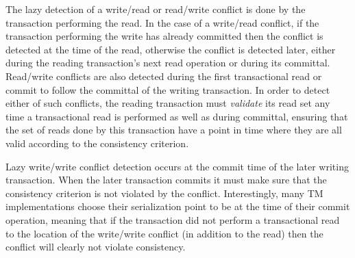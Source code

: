The lazy detection of a write/read or read/write conflict is done by the transaction performing the read.
In the case of a write/read conflict, if the transaction performing the write has already committed then the
conflict is detected at the time of the read, otherwise
the conflict is detected later, either
during the reading transaction's next read operation or during its committal.
Read/write conflicts are also detected during the first transactional read
or commit to follow the committal of the writing transaction.
In order to detect either of such conflicts, the reading transaction
 must \emph{validate} its read set any time a transactional read is performed as well as during committal, 
ensuring that the set of reads done by this transaction have a point in time where
they are all valid according to the consistency criterion.

Lazy write/write conflict detection occurs at the commit time of the
later writing transaction.
When the later transaction commits it must make sure that the consistency criterion is not violated
by the conflict.
Interestingly, many TM implementations choose their serialization point to be at the time of their 
commit operation, meaning that if the transaction did not perform a transactional read to the location
of the write/write conflict (in addition to the read) then the conflict will clearly not violate consistency.



